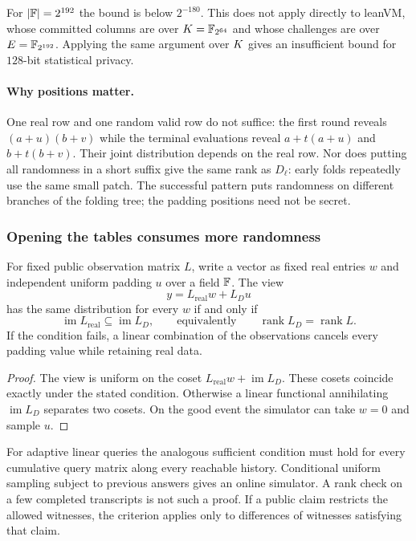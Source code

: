 For $|\mathbb{F}|=2^{192}$ the bound is below $2^{-180}$. This does not apply directly to leanVM, whose committed columns are over $K=\mathbb{F}_{2^{64}}$ and whose challenges are over $E=\mathbb{F}_{2^{192}}$. Applying the same argument over $K$ gives an insufficient bound for $128$-bit statistical privacy.

\paragraph{Why positions matter.} One real row and one random valid row do not suffice: the first round reveals $(a+u)(b+v)$ while the terminal evaluations reveal $a+t(a+u)$ and $b+t(b+v)$. Their joint distribution depends on the real row. Nor does putting all randomness in a short suffix give the same rank as $D_\ell$: early folds repeatedly use the same small patch. The successful pattern puts randomness on different branches of the folding tree; the padding positions need not be secret.

\subsubsection{Opening the tables consumes more randomness}

\begin{lemma}\label{lem:linear}
For fixed public observation matrix $L$, write a vector as fixed real entries $w$ and independent uniform padding $u$ over a field $\mathbb{F}$. The view
\[
 y=L_{\mathrm{real}}w+L_Du
\]
has the same distribution for every $w$ if and only if
\[
 \operatorname{im}L_{\mathrm{real}}\subseteq\operatorname{im}L_D,
 \qquad\text{equivalently}\qquad
 \operatorname{rank}L_D=\operatorname{rank}L.
\]
If the condition fails, a linear combination of the observations cancels every padding value while retaining real data.
\end{lemma}

\begin{proof}
The view is uniform on the coset $L_{\mathrm{real}}w+\operatorname{im}L_D$. These cosets coincide exactly under the stated condition. Otherwise a linear functional annihilating $\operatorname{im}L_D$ separates two cosets. On the good event the simulator can take $w=0$ and sample $u$.
\end{proof}

For adaptive linear queries the analogous sufficient condition must hold for every cumulative query matrix along every reachable history. Conditional uniform sampling subject to previous answers gives an online simulator. A rank check on a few completed transcripts is not such a proof. If a public claim restricts the allowed witnesses, the criterion applies only to differences of witnesses satisfying that claim.

